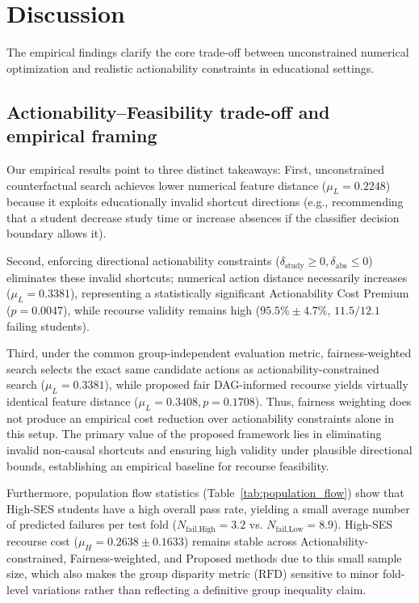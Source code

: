 \documentclass[11pt]{article}
\newcommand{\hlblock}[1]{\vspace{1mm}\noindent\colorbox{yellow!30}{\parbox{\dimexpr\linewidth-2\fboxsep\relax}{\sloppy #1\par}}\vspace{1mm}}
\begin{document}
\section{Discussion}
\label{sec:discussion}

The empirical findings clarify the core trade-off between unconstrained numerical optimization and realistic actionability constraints in educational settings.

\subsection{Actionability--Feasibility trade-off and empirical framing}

\hlblock{Our empirical results point to three distinct takeaways:
First, unconstrained counterfactual search achieves lower numerical feature distance ($\mu_L = 0.2248$) because it exploits educationally invalid shortcut directions (e.g., recommending that a student decrease study time or increase absences if the classifier decision boundary allows it).}

\hlblock{Second, enforcing directional actionability constraints ($\delta_{\text{study}} \ge 0, \delta_{\text{abs}} \le 0$) eliminates these invalid shortcuts; numerical action distance necessarily increases ($\mu_L = 0.3381$), representing a statistically significant Actionability Cost Premium ($p = 0.0047$), while recourse validity remains high ($95.5\% \pm 4.7\%$, $11.5 / 12.1$ failing students).}

\hlblock{Third, under the common group-independent evaluation metric, fairness-weighted search selects the exact same candidate actions as actionability-constrained search ($\mu_L = 0.3381$), while proposed fair DAG-informed recourse yields virtually identical feature distance ($\mu_L = 0.3408, p = 0.1708$). Thus, fairness weighting does not produce an empirical cost reduction over actionability constraints alone in this setup. The primary value of the proposed framework lies in eliminating invalid non-causal shortcuts and ensuring high validity under plausible directional bounds, establishing an empirical baseline for recourse feasibility.}

\hlblock{Furthermore, population flow statistics (Table~\ref{tab:population_flow}) show that High-SES students have a high overall pass rate, yielding a small average number of predicted failures per test fold ($N_{\text{fail,High}} = 3.2$ vs. $N_{\text{fail,Low}} = 8.9$). High-SES recourse cost ($\mu_H = 0.2638 \pm 0.1633$) remains stable across Actionability-constrained, Fairness-weighted, and Proposed methods due to this small sample size, which also makes the group disparity metric ($\text{RFD}$) sensitive to minor fold-level variations rather than reflecting a definitive group inequality claim.}
\end{document}
